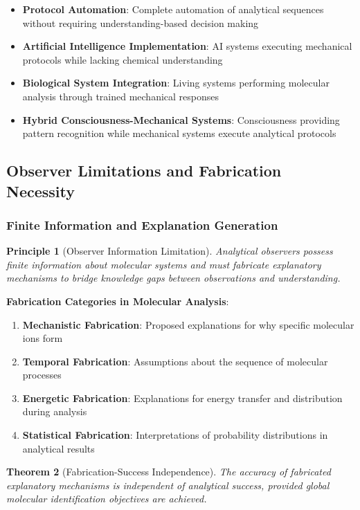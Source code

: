 \documentclass[11pt,a4paper]{article}
\newtheorem{theorem}{Theorem}[section]
\newtheorem{principle}[theorem]{Principle}
\theoremstyle{remark}
\begin{document}
\begin{itemize}
\item \textbf{Protocol Automation}: Complete automation of analytical sequences without requiring understanding-based decision making
\item \textbf{Artificial Intelligence Implementation}: AI systems executing mechanical protocols while lacking chemical understanding
\item \textbf{Biological System Integration}: Living systems performing molecular analysis through trained mechanical responses
\item \textbf{Hybrid Consciousness-Mechanical Systems}: Consciousness providing pattern recognition while mechanical systems execute analytical protocols
\end{itemize}

\subsection{Observer Limitations and Fabrication Necessity}

\subsubsection{Finite Information and Explanation Generation}

\begin{principle}[Observer Information Limitation]
Analytical observers possess finite information about molecular systems and must fabricate explanatory mechanisms to bridge knowledge gaps between observations and understanding.
\end{principle}

\textbf{Fabrication Categories in Molecular Analysis}:
\begin{enumerate}
\item \textbf{Mechanistic Fabrication}: Proposed explanations for why specific molecular ions form
\item \textbf{Temporal Fabrication}: Assumptions about the sequence of molecular processes
\item \textbf{Energetic Fabrication}: Explanations for energy transfer and distribution during analysis
\item \textbf{Statistical Fabrication}: Interpretations of probability distributions in analytical results
\end{enumerate}

\begin{theorem}[Fabrication-Success Independence]
The accuracy of fabricated explanatory mechanisms is independent of analytical success, provided global molecular identification objectives are achieved.
\end{theorem}
\end{document}
